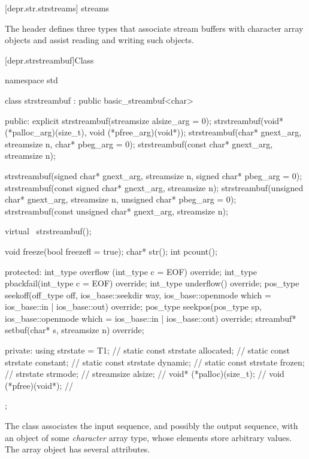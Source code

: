 [depr.str.strstreams]{ streams}

\pnum
The header
defines three types that associate stream buffers with
character array objects and assist reading and writing such objects.

[depr.strstreambuf]{Class }

%
\begin{codeblock}
namespace std {
  class strstreambuf : public basic_streambuf<char> {
  public:
    explicit strstreambuf(streamsize alsize_arg = 0);
    strstreambuf(void* (*palloc_arg)(size_t), void (*pfree_arg)(void*));
    strstreambuf(char* gnext_arg, streamsize n, char* pbeg_arg = 0);
    strstreambuf(const char* gnext_arg, streamsize n);

    strstreambuf(signed char* gnext_arg, streamsize n,
                 signed char* pbeg_arg = 0);
    strstreambuf(const signed char* gnext_arg, streamsize n);
    strstreambuf(unsigned char* gnext_arg, streamsize n,
                 unsigned char* pbeg_arg = 0);
    strstreambuf(const unsigned char* gnext_arg, streamsize n);

    virtual ~strstreambuf();

    void  freeze(bool freezefl = true);
    char* str();
    int   pcount();

  protected:
    int_type overflow (int_type c = EOF) override;
    int_type pbackfail(int_type c = EOF) override;
    int_type underflow() override;
    pos_type seekoff(off_type off, ios_base::seekdir way,
                     ios_base::openmode which
                      = ios_base::in | ios_base::out) override;
    pos_type seekpos(pos_type sp,
                     ios_base::openmode which
                      = ios_base::in | ios_base::out) override;
    streambuf* setbuf(char* s, streamsize n) override;

  private:
    using strstate = T1;              // \expos
    static const strstate allocated;  // \expos
    static const strstate constant;   // \expos
    static const strstate dynamic;    // \expos
    static const strstate frozen;     // \expos
    strstate strmode;                 // \expos
    streamsize alsize;                // \expos
    void* (*palloc)(size_t);          // \expos
    void (*pfree)(void*);             // \expos
  };
}
\end{codeblock}

\pnum
The class
associates the input sequence, and possibly the output sequence, with an object of some
\textit{character}
array type, whose elements store arbitrary values.
The array object has several attributes.

